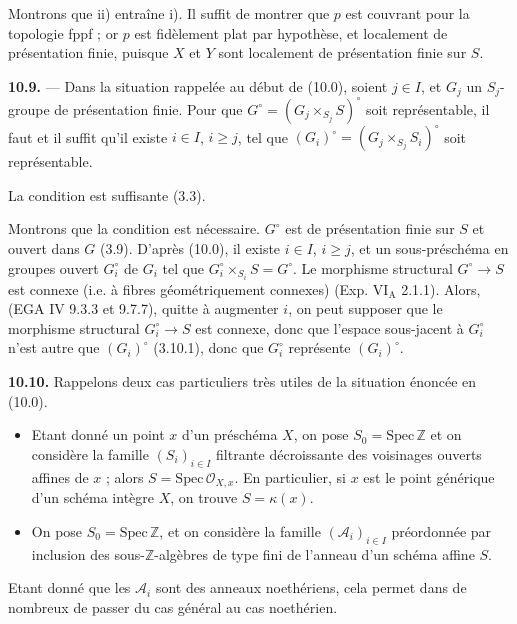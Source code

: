 \documentclass[11pt,a4paper]{article}
\begin{document}
Montrons que ii) entraîne i). Il suffit de montrer que $p$ est couvrant
pour la topologie fppf ; or $p$ est fidèlement plat par hypothèse, et
localement de présentation finie, puisque $X$ et $Y$ sont localement de
présentation finie sur $S$.

\textbf{10.9.} — Dans la situation rappelée au début de (10.0), soient
$j \in I$, et $G_{j}$ un $S_{j}$-groupe de présentation finie. Pour que
$G^{\circ} = (G_{j} \times_{S_{j}} S)^{\circ}$ soit représentable, il
faut et il suffit qu'il existe \struck{\ill{}} $i \in I$, $i \geqslant j$,
tel que $(G_{i})^{\circ} = (G_{j} \times_{S_{j}} S_{i})^{\circ}$ soit
représentable.

La condition est suffisante (3.3).

Montrons que la condition est nécessaire.  
$G^{\circ}$ est de présentation finie sur $S$ et ouvert dans $G$ (3.9).
D'après (10.0), il existe $i \in I$, $i \geqslant j$, et un
sous-préschéma en groupes ouvert $G_{i}^{\circ}$ de $G_{i}$ tel que
$G_{i}^{\circ} \times_{S_{i}} S = G^{\circ}$. Le morphisme structural
$G^{\circ} \to S$ est connexe (i.e. à fibres géométriquement connexes)
(Exp. VI$_{\mathrm{A}}$ 2.1.1). Alors, (EGA IV 9.3.3 et 9.7.7), quitte à
augmenter $i$, on peut supposer que le morphisme structural
$G_{i}^{\circ} \to S$ est connexe, donc que l'espace sous-jacent à
$G_{i}^{\circ}$ n'est autre que $(G_{i})^{\circ}$ (3.10.1), donc que
$G_{i}^{\circ}$ représente $(G_{i})^{\circ}$.

\textbf{10.10.} Rappelons deux cas particuliers très utiles de la
situation énoncée en (10.0).
\begin{itemize}
  \item[a)] Etant donné un point $x$ d'un préschéma $X$, on pose
    $S_{0} = \mathrm{Spec}\, \mathbb{Z}$ et on considère la famille
    $(S_{i})_{i \in I}$ filtrante décroissante des voisinages
    \struck{\ill{}} ouverts affines de $x$ ; alors
    $S = \mathrm{Spec}\, \mathcal{O}_{X,x}$. En particulier, si $x$ est le
    point générique d'un schéma intègre $X$, on trouve $S = \kappa(x)$.
  \item[b)] On pose $S_{0} = \mathrm{Spec}\, \mathbb{Z}$, et on considère
    la famille $(\mathcal{A}_{i})_{i \in I}$ préordonnée par inclusion des
    sous-$\mathbb{Z}$-algèbres de type fini de l'anneau d'un schéma affine
    $S$.
\end{itemize}
Etant donné que les $\mathcal{A}_{i}$ sont des anneaux \struck{\ill{}}
noethériens, cela permet dans de nombreux  de passer du cas
général au cas noethérien.
\end{document}
